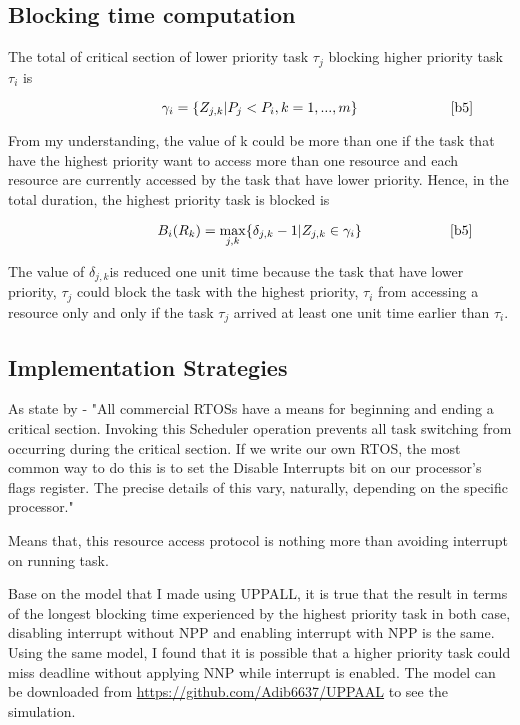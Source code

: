\subsection{Blocking time computation}

	The total of critical section of lower priority task $\tau_{j}$ blocking higher priority task $\tau_{i}$ is

\begin{equation}
\citeequation{ \gamma_{i}=\{Z_{j,k} | P_{j}<P_{i}, k=1,...,m \}}{b5}\label{eq6}
\end{equation}

From my understanding, the value of k could be more than one if the task that have the highest priority want to access more than one resource and each resource are currently accessed by the task that have lower priority. Hence, in the total duration, the highest priority task is blocked is

\begin{equation}
\citeequation{B_{i}(R_{k})=\underset{j,k}{\mathrm{max}} \{ \delta_{j,k}-1 | Z_{j,k} \in \gamma_{i}\}}{b5}\label{eq7}
\end{equation}


The value of $\delta_{j,k}$is reduced one unit time because the task that have lower priority, $\tau_{j}$ could block the task with the highest priority, $\tau_{i}$ from accessing a resource only and only if the task $\tau_{j}$  arrived at least one unit time earlier than $\tau_{i}$.

\subsection{Implementation Strategies}

As state by \cite{b6} - "All commercial RTOSs have a means for beginning and ending a critical section. Invoking this Scheduler operation prevents all task switching from occurring during the critical section. If we write our own RTOS, the most common way to do this is to set the Disable Interrupts bit on our processor's flags register. The precise details of this vary, naturally, depending on the specific processor."

Means that, this resource access protocol is nothing more than avoiding interrupt on running task. 

Base on the model that I made using UPPALL, it is true that the result in terms of the longest blocking time experienced by the highest priority task in both case, disabling interrupt without NPP and enabling interrupt with NPP is the same. Using the same model, I found that it is possible that a higher priority task could miss deadline without applying NNP while interrupt is enabled. The model can be downloaded from \url{https://github.com/Adib6637/UPPAAL} to see the simulation.

